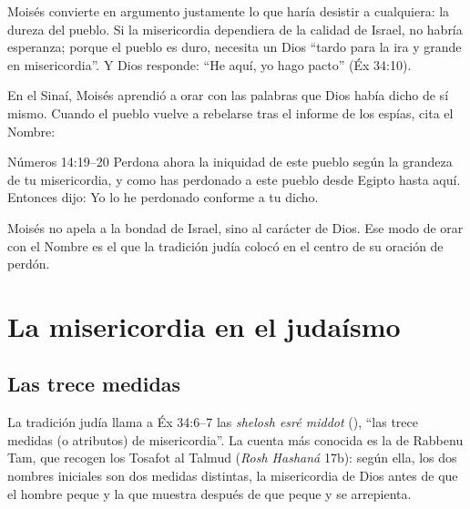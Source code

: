 Moisés convierte en argumento justamente lo que haría desistir a cualquiera: la dureza del pueblo. Si la misericordia dependiera de la calidad de Israel, no habría esperanza; porque el pueblo es duro, necesita un Dios ``tardo para la ira y grande en misericordia''. Y Dios responde: ``He aquí, yo hago pacto'' (Éx 34:10).

En el Sinaí, Moisés aprendió a orar con las palabras que Dios había dicho de sí mismo. Cuando el pueblo vuelve a rebelarse tras el informe de los espías, cita el Nombre:

\begin{verso}{Números 14:19–20}
Perdona ahora la iniquidad de este pueblo según la grandeza de tu misericordia, y como has perdonado a este pueblo desde Egipto hasta aquí. Entonces \SENOR{} dijo: Yo lo he perdonado conforme a tu dicho.
\end{verso}

Moisés no apela a la bondad de Israel, sino al carácter de Dios. Ese modo de orar con el Nombre es el que la tradición judía colocó en el centro de su oración de perdón.

\section{La misericordia en el judaísmo}

\subsection{Las trece medidas}
La tradición judía llama a Éx 34:6--7 las \emph{shelosh esré middot} (), ``las trece medidas (o atributos) de misericordia''. La cuenta más conocida es la de Rabbenu Tam, que recogen los Tosafot al Talmud (\emph{Rosh Hashaná} 17b): según ella, los dos nombres iniciales son dos medidas distintas, la misericordia de Dios antes de que el hombre peque y la que muestra después de que peque y se arrepienta.

